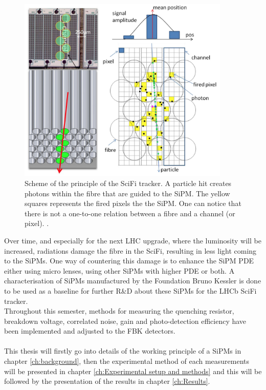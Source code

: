 \begin{figure}[htbp]
    \centering
    \includegraphics[width=0.9\textwidth]{gfx/pictures/fibretosipm.png}
    \caption{Scheme of the principle of the SciFi tracker. A particle hit creates photons within the fibre that are guided to the SiPM. The yellow squares represents the fired pixels the the SiPM. One can notice that there is not a one-to-one relation between a fibre and a channel (or pixel). \cite{KirnSciFi-ALHCb}.}
    \label{fig:fibre to sipm}
\end{figure}
Over time, and especially for the next LHC upgrade, where the luminosity will be increased, radiations damage the fibre in the SciFi, resulting in less light coming to the SiPMs. One way of countering this damage is to enhance the SiPM PDE either using micro lenses\cite{TripplDevelopmentLHCb}, using other SiPMs with higher PDE or both. 
A characterisation of SiPMs manufactured by the Foundation Bruno Kessler \cite{FBKKessler} is done to be used as a baseline for further R\&D about these SiPMs for the LHCb SciFi tracker.\\ 
Throughout this semester, methods for measuring the quenching resistor, breakdown voltage, correlated noise, gain and photo-detection efficiency have been implemented and adjusted to the FBK detectors.\\
\\
This thesis will firstly go into details of the working principle of a SiPMs in chapter \ref{ch:background}, then the experimental method of each measurements will be presented in chapter \ref{ch:Experimental setup and methods} and this will be followed by the presentation of the results in chapter \ref{ch:Results}.


